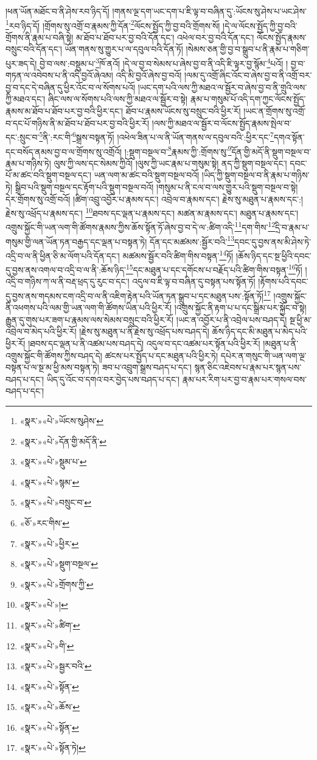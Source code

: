།ཕན་ཡོན་མཐོང་བ་ནི་ཤེས་རབ་ཉིད་དོ། །གནས་ལྔ་དག་ཡང་དག་པ་ཇི་ལྟ་བ་བཞིན་དུ་:ཡོངས་སུ་ཤེས་པ་ཡང་ཤེས་\footnote{«སྣར་»«པེ་»ཡོངས་སུཤེས་}རབ་ཉིད་དོ། །གྲོགས་སུ་འགྲོ་བ་རྣམས་ཀྱི་དོན་\footnote{«སྣར་»«པེ་»དོན་གྱི་མདོ་ནི་}ལོངས་སྤྱོད་ཀྱི་བྱ་བའི་གྲོགས་སོ། །དེ་ལ་ལོངས་སྤྱོད་ཀྱི་བྱ་བའི་གྲོགས་ནི་རྣམ་པ་བཞི་སྟེ། མ་ཐོབ་པ་ཐོབ་པར་བྱ་བའི་དོན་དང་། འཕེལ་བར་བྱ་བའི་དོན་དང་། ལོངས་སྤྱོད་རྣམས་བསྲུང་བའི་དོན་དང་། ཡོན་གནས་སུ་གྱུར་པ་ལ་དབུལ་བའི་དོན་ཏོ། །སེམས་ཅན་གྱི་བྱ་བ་སྒྲུབ་པ་ནི་རྣམ་པ་གཅིག་པུར་ཟད་དེ། བྱེ་བ་ལས་:བསྡུམ་པ་\footnote{«སྣར་»«པེ་»སྡུམ་པ་}ཁོ་ནའོ། །དེ་ལ་བྱ་བ་སེམས་པ་ཞེས་བྱ་བ་ནི་འདི་ཇི་ལྟར་བྱ་སྙོམ་\footnote{«སྣར་»«པེ་»སྙམ་}པའོ། །
བྱ་བ་གཏན་ལ་འབེབས་པ་ནི་འདི་བྱའོ་ཞེའམ། འདི་མི་བྱའོ་ཞེས་བྱ་བའོ། །ལམ་དུ་འགྲོ་ཞིང་འོང་བ་ཞེས་བྱ་བ་ནི་འགྲོ་བར་བྱ་བ་དང་དེ་བཞིན་དུ་ཕྱིར་འོང་བ་ལ་སོགས་པའོ། །ཡང་དག་པའི་ལས་ཀྱི་མཐའ་ལ་སྦྱོར་བ་ཞེས་བྱ་བ་ནི་གྲུའི་ལས་ཀྱི་མཐའ་དང་། ཞིང་ལས་ལ་སོགས་པའི་ལས་ཀྱི་མཐའ་ལ་སྦྱོར་བ་སྟེ། རྣམ་པ་གསུམ་པོ་འདི་དག་ཀྱང་ལོངས་སྤྱོད་རྣམས་མ་ཐོབ་པ་ཐོབ་པར་བྱ་བའི་ཕྱིར་དང་། ཐོབ་པ་རྣམས་ཡོངས་སུ་བསྲུང་བའི་ཕྱིར་རོ། །ཡང་ན་གྲོགས་སུ་འགྲོ་བ་དང་པོ་གཉིས་ནི་མ་ཐོབ་པ་ཐོབ་པར་བྱ་བའི་ཕྱིར་རོ། །ལས་ཀྱི་མཐའ་ལ་སྦྱོར་བ་ལོངས་སྤྱོད་རྣམས་སྤེལ་བ་དང་:སྲུང་བ་\footnote{«སྣར་»«པེ་»བསྲུང་བ་}ནི་:རང་གི་\footnote{«ཅོ་»རང་གིས་}སྒྲས་བསྟན་ཏོ། །འཕེལ་ཟིན་པ་ལ་ནི་ཡོན་གནས་ལ་དབུལ་བའི་:ཕྱིར་དང་\footnote{«སྣར་»«པེ་»ཕྱིར་}དགའ་སྟོན་དང་བསོད་ནམས་བྱ་བ་ལ་གྲོགས་སུ་འགྲོའོ། །:སྡུག་བསྔལ་བ་\footnote{«སྣར་»«པེ་»སྡུག་བསྔལ་}རྣམས་ཀྱི་:གྲོགས་སུ་\footnote{«སྣར་»«པེ་»གྲོགས་ཀྱི་}དོན་གྱི་མདོ་ནི་སྡུག་བསྔལ་བ་རྣམ་པ་གཉིས་ཏེ། ལུས་ཀྱི་ལས་དང་སེམས་ཀྱིའོ། །ལུས་ཀྱི་ཡང་རྣམ་པ་གསུམ་སྟེ། ནད་ཀྱི་སྡུག་བསྔལ་དང་། དབང་པོ་མ་ཚང་བའི་སྡུག་བསྔལ་དང་། ཡན་ལག་མ་ཚང་བའི་སྡུག་བསྔལ་བའོ། །ཡིད་ཀྱི་སྡུག་བསྔལ་བ་ནི་རྣམ་པ་གཉིས་ཏེ། སྒྲིབ་པའི་སྡུག་བསྔལ་དང་རྟོག་པའི་སྡུག་བསྔལ་བའོ། །གསུམ་པ་ནི་ངལ་བ་ལས་གྱུར་པའི་སྡུག་བསྔལ་བ་སྟེ། དེར་གྲོགས་སུ་འགྲོ་བའོ། །ཚིག་འབྲུ་འབྱོར་པ་རྣམས་དང་། འབྲེལ་བ་རྣམས་དང་། རྗེས་སུ་མཐུན་པ་རྣམས་དང་:། རྗེས་སུ་འཕྲོད་པ་རྣམས་དང་། \footnote{«སྣར་»«པེ་»།  }ཐབས་དང་ལྡན་པ་རྣམས་དང་། མཚན་མ་རྣམས་དང་། མཐུན་པ་རྣམས་དང་། འགྲུས་སྐྱོང་གི་ཡན་ལག་གི་ཚོགས་རྣམས་ཀྱིས་ཆོས་སྟོན་ཏོ་ཞེས་བྱ་བ་དེ་ལ་:ཚིག་འདི་\footnote{«སྣར་»«པེ་»ཚིག་}དག་གིས་\footnote{«སྣར་»«པེ་»གི་}དྲི་བ་རྣམ་པ་གསུམ་གྱི་ལན་ཡོན་ཏན་བརྒྱད་དང་ལྡན་པ་བསྟན་ཏེ། དོན་དང་མཚམས་:སྦྱོར་བའི་\footnote{«སྣར་»«པེ་»སྦྱར་བའི་}དབང་དུ་བྱས་ནས་མི་ཤེས་ཏེ་འདྲི་བ་ལ་ནི་ཕྱིན་ཅི་མ་ལོག་པའི་དོན་དང་། མཚམས་སྦྱོར་བའི་ཚིག་གིས་བསྟན་\footnote{«སྣར་»«པེ་»སྟོན་}ཏོ། །ཆོས་ཉིད་དང་སྔ་ཕྱིའི་དབང་དུ་བྱས་ནས་འགལ་བ་འདྲི་བ་ལ་ནི་:ཆོས་ཉིད་\footnote{«སྣར་»«པེ་»ཆོས་}དང་མཐུན་པ་དང་དགོངས་པ་བརྗོད་པའི་ཚིག་གིས་བསྟན་\footnote{«སྣར་»«པེ་»སྟོན་}ཏོ། །འདྲི་བ་གཉིས་ཀ་ལ་ནི་བརྡ་ཕྲད་དུ་རུང་བ་དང་། འདུལ་བ་ཇི་ལྟ་བ་བཞིན་དུ་བསྟན་པས་སྟོན་ཏོ། །རྟོགས་པའི་དབང་དུ་བྱས་ནས་གདམས་ངག་འདྲི་བ་ལ་ནི་འཇིག་རྟེན་པའི་ཡོན་ཏན་སྒྲུབ་པ་དང་མཐུན་པས་:སྟོན་ཏོ།\footnote{«སྣར་»«པེ་»སྟོན་ཏེ།} །འགྲུས་སྐྱོང་ནི་འཕགས་པའི་ལམ་གྱི་ཡན་ལག་གི་ཚོགས་ཡིན་པའི་ཕྱིར་རོ། །འགྲུས་སྐྱོང་ནི་རྟག་པ་པ་དང་སྒྲིམ་པར་སྐྱོང་བ་སྟེ། རྒྱུན་དུ་གུས་པར་ཟག་པ་རྣམས་ལས་སེམས་བསྲུང་བའི་ཕྱིར་རོ། །ཡང་ན་འབྱོར་པ་ནི་འབྲེལ་པས་བཤད་དེ། སྔ་ཕྱི་མ་འབྲེལ་བ་མེད་པའི་ཕྱིར་རོ། །རྗེས་སུ་མཐུན་པ་ནི་རྗེས་སུ་འཕྲོད་པས་བཤད་དེ། ཆོས་ཉིད་དང་མི་མཐུན་པ་མེད་པའི་ཕྱིར་རོ། །ཐབས་དང་ལྡན་པ་ནི་འཚམ་པས་བཤད་དེ། འདུལ་བ་དང་འཚམ་པར་སྟོན་པའི་ཕྱིར་རོ། །མཐུན་པ་ནི་འགྲུས་སྐྱོང་གི་ཚོགས་ཀྱིས་བཤད་དེ། ཚངས་པར་སྤྱོད་པ་དང་མཐུན་པའི་ཕྱིར་ཏེ། དཔེར་ན་གསུང་གི་ཡན་ལག་ལྔ་བསྟན་པ་ལ་སྔ་མ་ཕྱི་མས་བསྟན་ཏེ། ཟབ་པ་འབྲུག་སྒྲས་བཤད་པ་དང་། སྙན་ཅིང་འཇེབས་པ་རྣམ་པར་སྙན་པས་བཤད་པ་དང་། ཡིད་དུ་འོང་བ་དགའ་བར་བྱེད་པས་བཤད་པ་དང་། རྣམ་པར་རིག་པར་བྱ་བ་རྣམ་པར་གསལ་བས་བཤད་པ་དང་། 